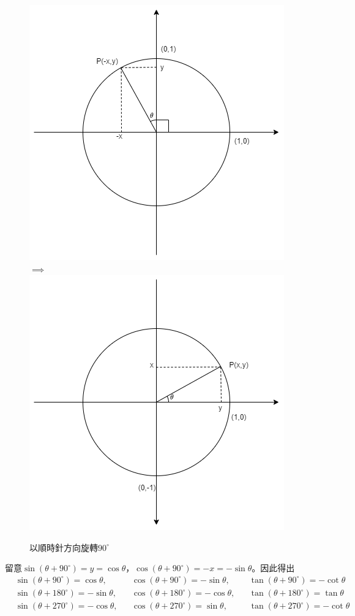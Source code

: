 \documentclass[12pt]{article}
\begin{document}
    \begin{figure}[H]
        \centering
        \includegraphics[scale=0.4]{circleII.png}
        $\implies$
        \includegraphics[scale=0.4]{circleI.png}
        \caption{以順時針方向旋轉$90^\circ$}
    \end{figure}

    留意$\sin(\theta+90^\circ)=y=\cos{\theta}$，$\cos(\theta+90^\circ)=-x=-\sin{\theta}$。因此得出\begin{align*}
        &\sin(\theta+90^\circ)=\cos{\theta},&&\cos(\theta+90^\circ)=-\sin{\theta},&&\tan(\theta+90^\circ)=-\cot{\theta}\\
        &\sin(\theta+180^\circ)=-\sin{\theta},&&\cos(\theta+180^\circ)=-\cos{\theta},&&\tan(\theta+180^\circ)=\tan{\theta}\\
        &\sin(\theta+270^\circ)=-\cos{\theta},&&\cos(\theta+270^\circ)=\sin{\theta},&&\tan(\theta+270^\circ)=-\cot{\theta}
    \end{align*}
\end{document}
